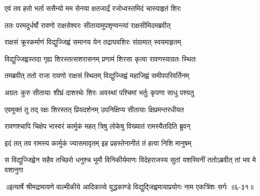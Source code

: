 \twolineshloka
{एवं तव हतो भर्ता ससैन्यो मम सेनया}
{क्षतजार्द्रं रजोध्वस्तमिदं चास्याहृतं शिरः} %

\twolineshloka
{ततः परमदुर्धर्षो रावणो राक्षसेश्वरः}
{सीतायामुपशृण्वन्त्यां राक्षसीमिदमब्रवीत्} %

\twolineshloka
{राक्षसं क्रूरकर्माणं विद्युज्जिह्वं समानय}
{येन तद्राघवशिरः संग्रामात् स्वयमाहृतम्} %

\twolineshloka
{विद्युज्जिह्वस्तदा गृह्य शिरस्तत्सशरासनम्}
{प्रणामं शिरसा कृत्वा रावणस्याग्रतः स्थितः} %

\twolineshloka
{तमब्रवीत् ततो राजा रावणो राक्षसं स्थितम्}
{विद्युज्जिह्वं महाजिह्वं समीपपरिवर्तिनम्} %

\twolineshloka
{अग्रतः कुरु सीतायाः शीघ्रं दाशरथेः शिरः}
{अवस्थां पश्चिमां भर्तुः कृपणा साधु पश्यतु} %

\twolineshloka
{एवमुक्तं तु तद् रक्षः शिरस्तत् प्रियदर्शनम्}
{उपनिक्षिप्य सीतायाः क्षिप्रमन्तरधीयत} %

\twolineshloka
{रावणश्चापि चिक्षेप भास्वरं कार्मुकं महत्}
{त्रिषु लोकेषु विख्यातं रामस्यैतदिति ब्रुवन्} %

\twolineshloka
{इदं तत् तव रामस्य कार्मुकं ज्यासमावृतम्}
{इह प्रहस्तेनानीतं तं हत्वा निशि मानुषम्} %

\twolineshloka
{स विद्युज्जिह्वेन सहैव तच्छिरो धनुश्च भूमौ विनिकीर्यमाणः}
{विदेहराजस्य सुतां यशस्विनीं ततोऽब्रवीत् तां भव मे वशानुगा} %


॥इत्यार्षे श्रीमद्रामायणे वाल्मीकीये आदिकाव्ये युद्धकाण्डे विद्युद्जिह्वमायाप्रयोगः नाम एकत्रिंशः सर्गः ॥६-३१॥
